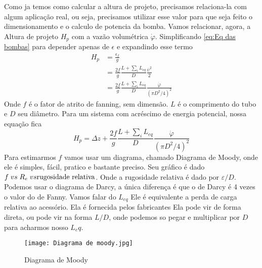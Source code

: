 Como ja temos como calcular a altura de projeto, precisamos relaciona-la com algum aplicação real,
ou seja, precisamos utilizar esse valor para que seja feito o dimensionamento e o calculo de
potencia da bomba. Vamos relacionar, agora, a Altura de projeto \(H_p\) com a vazão volumétrica
\(\dot{\varphi}\). Simplificando \eqref{eq:Eq das bombas} para depender apenas de \(\epsilon\) e
expandindo esse termo
\begin{align}\label{eq:vazao e hp}
    H_p&=\frac{\epsilon_f}{g}\\
    &=\frac{2f}{g}\frac{L+\sum_iL_{eq}}{D}\frac{\overline{\upsilon}^2}{2}\\
    &=\frac{2f}{g}\frac{L+\sum_iL_{eq}}{D}\frac{\dot{\varphi}}{(\pi D^2/4)^2}
\end{align}
Onde \(f\) é o fator de atrito de fanning, sem dimensão. \(L\) é o comprimento do tubo e \(D\) seu
diâmetro. Para um sistema com acréscimo de energia potencial, nossa equação fica
\begin{equation}
    H_p=\Delta z + \frac{2f}{g}\frac{L+\sum_iL_{eq}}{D}\frac{\dot{\varphi}}{(\pi D^2/4)^2}
\end{equation}
Para estimarmos \(f\) vamos usar um diagrama, chamado Diagrama de Moody, onde ele é simples, fácil,
pratico e bastante preciso. Seu gráfico é dado \(f \; vs \; R_e \; vs \; \\ \text{rugosidade
relativa}\). Onde a rugosidade relativa é dado por \(\varepsilon/D\). Podemos usar o diagrama de
Darcy, a única diferença é que o de Darcy é 4 vezes o valor do de Fanny. Vamos falar do \(L_{eq}\)
Ele é equivalente a perda de carga relativa ao acessório. Ela é fornecida pelos fabricantes Ela pode
vir de forma direta, ou pode vir na forma \(L/D\), onde podemos so pegar e multiplicar por \(D\)
para acharmos nosso \(L_eq\). \par
\begin{figure}[H]
    \centering
    \texttt{[image: Diagrama de moody.jpg]}
    \caption{Diagrama de Moody}
    \label{fig: diagrama de moody}
\end{figure}    
